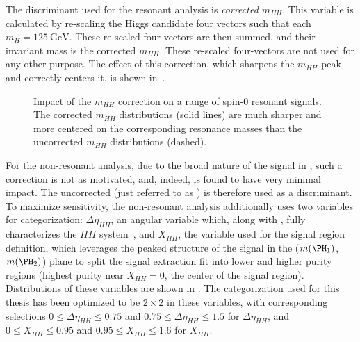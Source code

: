 The discriminant used for the resonant analysis is \emph{corrected $m_{HH}$}. This
variable is calculated by re-scaling the Higgs candidate four vectors such that
each $m_{H} = \SI{125}{\GeV}$. These re-scaled four-vectors are then summed, and
their invariant mass is the corrected $m_{HH}$. These re-scaled four-vectors are
not used for any other purpose. The effect of this correction, which sharpens
the $m_{HH}$ peak and correctly centers it, is shown
in~\Fig{\ref{fig:m-hh-cor-effect}}.
\begin{figure}[ht]
\centering
{}
\caption{\label{fig:m-hh-cor-effect} Impact of the $m_{HH}$ correction on a range of spin-0 
resonant signals. The corrected $m_{HH}$ distributions (solid lines) are much sharper and 
more centered on the corresponding resonance masses than the uncorrected $m_{HH}$ distributions 
(dashed).}
\end{figure}

For the non-resonant analysis, due to the broad nature of the signal in \mhh, such a 
correction is not as motivated, and, indeed, is found to have very minimal 
impact. The uncorrected \mhh (just referred to as \mhh) is therefore used 
as a discriminant. To maximize sensitivity, the non-resonant analysis 
additionally uses two variables for categorization: $\Delta \eta_{HH}$, an angular 
variable which, along with \mhh, fully characterizes the $HH$ system~\cite{cosThetastar}, 
and $X_{HH}$, the variable used for the 
signal region definition, which leverages the peaked structure of the 
signal in the ($\mh1$, $\mh2$) plane to split the signal extraction fit into lower and higher
purity regions (highest purity near $X_{HH} = 0$, the center of the signal region).
Distributions of these variables are shown in . The categorization used for this 
thesis has been optimized to be $2\times 2$ in these variables, with corresponding selections 
$0 \leq \Delta \eta_{HH} \leq 0.75$ and $0.75 \leq \Delta \eta_{HH} \leq 1.5$ for $\Delta \eta_{HH}$, 
and $0 \leq X_{HH} \leq 0.95$ and $0.95 \leq X_{HH} \leq 1.6$ for $X_{HH}$.



